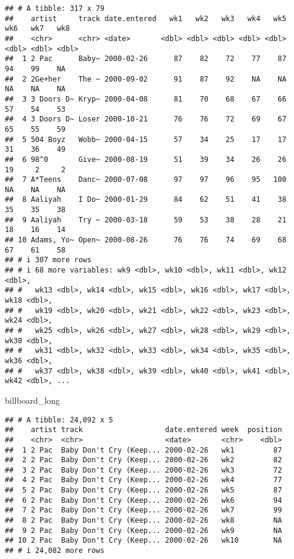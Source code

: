 \documentclass[
]{article}
\newenvironment{Shaded}{\begin{snugshade}}{\end{snugshade}}
\newcommand{\NormalTok}[1]{#1}
\begin{document}
\begin{verbatim}
## # A tibble: 317 x 79
##    artist     track date.entered   wk1   wk2   wk3   wk4   wk5   wk6   wk7   wk8
##    <chr>      <chr> <date>       <dbl> <dbl> <dbl> <dbl> <dbl> <dbl> <dbl> <dbl>
##  1 2 Pac      Baby~ 2000-02-26      87    82    72    77    87    94    99    NA
##  2 2Ge+her    The ~ 2000-09-02      91    87    92    NA    NA    NA    NA    NA
##  3 3 Doors D~ Kryp~ 2000-04-08      81    70    68    67    66    57    54    53
##  4 3 Doors D~ Loser 2000-10-21      76    76    72    69    67    65    55    59
##  5 504 Boyz   Wobb~ 2000-04-15      57    34    25    17    17    31    36    49
##  6 98^0       Give~ 2000-08-19      51    39    34    26    26    19     2     2
##  7 A*Teens    Danc~ 2000-07-08      97    97    96    95   100    NA    NA    NA
##  8 Aaliyah    I Do~ 2000-01-29      84    62    51    41    38    35    35    38
##  9 Aaliyah    Try ~ 2000-03-18      59    53    38    28    21    18    16    14
## 10 Adams, Yo~ Open~ 2000-08-26      76    76    74    69    68    67    61    58
## # i 307 more rows
## # i 68 more variables: wk9 <dbl>, wk10 <dbl>, wk11 <dbl>, wk12 <dbl>,
## #   wk13 <dbl>, wk14 <dbl>, wk15 <dbl>, wk16 <dbl>, wk17 <dbl>, wk18 <dbl>,
## #   wk19 <dbl>, wk20 <dbl>, wk21 <dbl>, wk22 <dbl>, wk23 <dbl>, wk24 <dbl>,
## #   wk25 <dbl>, wk26 <dbl>, wk27 <dbl>, wk28 <dbl>, wk29 <dbl>, wk30 <dbl>,
## #   wk31 <dbl>, wk32 <dbl>, wk33 <dbl>, wk34 <dbl>, wk35 <dbl>, wk36 <dbl>,
## #   wk37 <dbl>, wk38 <dbl>, wk39 <dbl>, wk40 <dbl>, wk41 <dbl>, wk42 <dbl>, ...
\end{verbatim}

\begin{Shaded}
\begin{Highlighting}[]
\NormalTok{billboard\_long}
\end{Highlighting}
\end{Shaded}

\begin{verbatim}
## # A tibble: 24,092 x 5
##    artist track                   date.entered week  position
##    <chr>  <chr>                   <date>       <chr>    <dbl>
##  1 2 Pac  Baby Don't Cry (Keep... 2000-02-26   wk1         87
##  2 2 Pac  Baby Don't Cry (Keep... 2000-02-26   wk2         82
##  3 2 Pac  Baby Don't Cry (Keep... 2000-02-26   wk3         72
##  4 2 Pac  Baby Don't Cry (Keep... 2000-02-26   wk4         77
##  5 2 Pac  Baby Don't Cry (Keep... 2000-02-26   wk5         87
##  6 2 Pac  Baby Don't Cry (Keep... 2000-02-26   wk6         94
##  7 2 Pac  Baby Don't Cry (Keep... 2000-02-26   wk7         99
##  8 2 Pac  Baby Don't Cry (Keep... 2000-02-26   wk8         NA
##  9 2 Pac  Baby Don't Cry (Keep... 2000-02-26   wk9         NA
## 10 2 Pac  Baby Don't Cry (Keep... 2000-02-26   wk10        NA
## # i 24,082 more rows
\end{verbatim}
\end{document}
